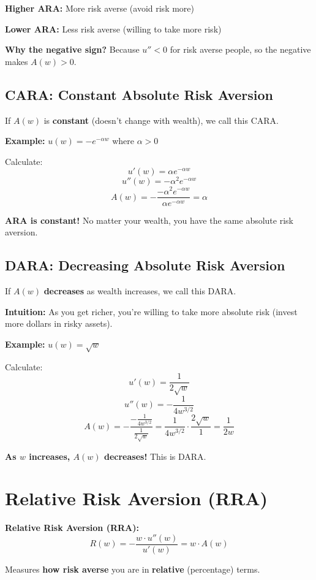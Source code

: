 \documentclass[12pt]{article}
\begin{document}
\textbf{Higher ARA:} More risk averse (avoid risk more)

\textbf{Lower ARA:} Less risk averse (willing to take more risk)

\textbf{Why the negative sign?} Because $u'' < 0$ for risk averse people, so the negative makes $A(w) > 0$.

\subsection*{CARA: Constant Absolute Risk Aversion}

If $A(w)$ is \textbf{constant} (doesn't change with wealth), we call this CARA.

\textbf{Example:} $u(w) = -e^{-\alpha w}$ where $\alpha > 0$

Calculate:
$$u'(w) = \alpha e^{-\alpha w}$$
$$u''(w) = -\alpha^2 e^{-\alpha w}$$
$$A(w) = -\frac{-\alpha^2 e^{-\alpha w}}{\alpha e^{-\alpha w}} = \alpha$$

\textbf{ARA is constant!} No matter your wealth, you have the same absolute risk aversion.

\subsection*{DARA: Decreasing Absolute Risk Aversion}

If $A(w)$ \textbf{decreases} as wealth increases, we call this DARA.

\textbf{Intuition:} As you get richer, you're willing to take more absolute risk (invest more dollars in risky assets).

\textbf{Example:} $u(w) = \sqrt{w}$

Calculate:
$$u'(w) = \frac{1}{2\sqrt{w}}$$
$$u''(w) = -\frac{1}{4w^{3/2}}$$
$$A(w) = -\frac{-\frac{1}{4w^{3/2}}}{\frac{1}{2\sqrt{w}}} = \frac{1}{4w^{3/2}} \cdot \frac{2\sqrt{w}}{1} = \frac{1}{2w}$$

\textbf{As $w$ increases, $A(w)$ decreases!} This is DARA.

\newpage

\section*{Relative Risk Aversion (RRA)}

\begin{center}
\colorbox{magenta!20}{
\begin{minipage}{0.9\textwidth}
\textbf{Relative Risk Aversion (RRA):}
$$R(w) = -\frac{w \cdot u''(w)}{u'(w)} = w \cdot A(w)$$

Measures \textbf{how risk averse} you are in \textbf{relative} (percentage) terms.
\end{minipage}
}
\end{center}
\end{document}
